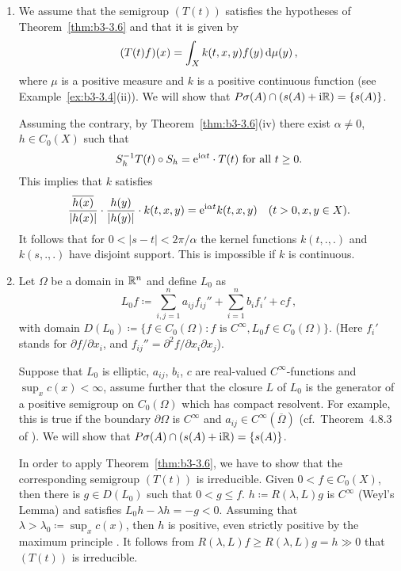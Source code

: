 \begin{examples}\label{ex:b3-3.10}
%
	
	\begin{enumerate}[\upshape (i), wide, labelindent=.5em] 
	\item 
	We assume that the semigroup $(T(t))$ satisfies the hypotheses of Theorem~\ref{thm:b3-3.6} and that it is given by
	\[
	(T(t)f)(x) = \int_{X} k(t,x,y)f(y) \mathop{}\!\mathrm{d}{\mu}(y)\,,
	\]
	where $\mu$ is a positive measure and $k$ is a positive continuous function (see Example~\ref{ex:b3-3.4}(ii)).
	We will show that $P\sigma(A)\cap(s(A) + \mathrm{i}\mathbb{R}) = \{s(A)\}$.
	
	Assuming the contrary, by Theorem~\ref{thm:b3-3.6}(iv) there exist $\alpha \neq 0$, $h \in C_{0}(X)$ such that
	\begin{equation}\label{eq:b3-3.10}
	S_{h}^{-1}T(t)\circ S_{h} = \mathrm{e}^{\mathrm{i}\alpha t}\cdot T(t) \text{ for all } t \geq 0.
	\end{equation}
	This implies that $k$ satisfies
	\begin{equation}\label{eq:b3-3.11}
	\frac{\overline{h(x)}}{|h(x)|}\cdot\frac{h(y)}{|h(y)|}\cdot k(t,x,y) = \mathrm{e}^{\mathrm{i}\alpha t}k(t,x,y) \quad (t > 0, x,y \in X).
	\end{equation}
	It follows that for $0 < |s-t| < 2\pi/\alpha$ the kernel functions  $k(t,.,.)$ and $k(s,.,.)$ have disjoint support.
	This is impossible if $k$ is continuous.
	
	\item 
	Let $\Omega$ be a domain in $\mathbb{R}^{n}$ and define $L_{0}$ as
	\[
	L_{0}f \coloneq \sum_{i,j=1}^{n} a_{ij}f_{ij}'' + \sum_{i=1}^{n}b_{i}f_{i}' + cf\,,
	\]
	with domain $D(L_{0}) \coloneq \{f \in C_{0}(\Omega) \colon f \text{ is } C^{\infty}, L_{0}f \in C_{0}(\Omega)\}$.
	(Here $f_{i}'$ stands for $\partial f/\partial x_{i}$, and $f_{ij}'' = \partial^{2}f/\partial x_{i}\partial x_{j}$).
	
	Suppose that $L_{0}$ is elliptic, $a_{ij}$, $b_{i}$, $c$ are real-valued $C^{\infty}$-functions and $\sup_x c(x) < \infty$, assume further that the closure $L$ of $L_{0}$ is the generator of a positive semigroup on $C_{0}(\Omega)$ which has compact resolvent.
	For example, this is true if the boundary  $\partial\Omega$ is $C^{\infty}$ and $a_{ij} \in C^{\infty}(\overline{\Omega})$ (cf.\ Theorem~4.8.3 of \citet{fattorini:1983}).
	We will show that $P\sigma(A)\cap(s(A) + \mathrm{i}\mathbb{R}) = \{s(A)\}$.
	
	In order to apply Theorem~\ref{thm:b3-3.6}, we have to show that the corresponding semigroup $(T(t))$ is irreducible.
	Given $0 < f \in C_{0}(X)$, then there is $g \in D(L_{0})$ such that $0 < g \leq f$.
	$h \coloneq R(\lambda,L)g$ is $C^{\infty}$ (Weyl's Lemma) and satisfies $L_{0}h - \lambda h = -g < 0$.
	Assuming that $\lambda > \lambda_{0} \coloneqq \sup_x c(x)$, then $h$ is positive, even strictly positive by the maximum principle \citet[Chapter~2, Theorem~6]{protterweinberger:1967}.
	It follows from $R(\lambda,L)f \geq R(\lambda,L)g = h \gg 0$ that $(T(t))$ is irreducible.
	

\end{enumerate}
\end{examples}
